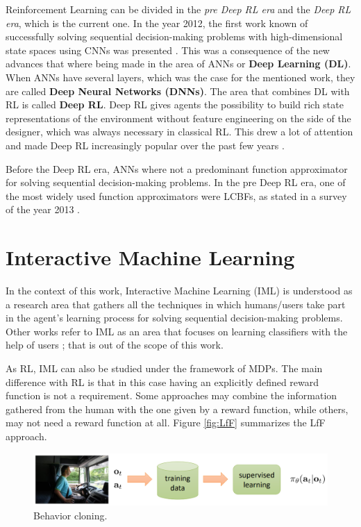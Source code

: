 Reinforcement Learning can be divided in the \emph{pre Deep RL era} and the \emph{Deep RL era}, which is the current one. In the year 2012, the first work known of successfully solving sequential decision-making problems with high-dimensional state spaces using CNNs was presented \cite{Mnih2015}. This was a consequence of the new advances that where being made in the area of ANNs or \textbf{Deep Learning (DL)}. When ANNs have several layers, which was the case for the mentioned work, they are called \textbf{Deep Neural Networks (DNNs)}. The area that combines DL with RL is called \textbf{Deep RL}. Deep RL gives agents the possibility to build rich state representations of the environment without feature engineering on the side of the designer, which was always necessary in classical RL. This drew a lot of attention and made Deep RL increasingly popular over the past few years \cite{franccois2018introduction}.

Before the Deep RL era, ANNs where not a predominant function approximator for solving sequential decision-making problems. In the pre Deep RL era, one of the most widely used function approximators were LCBFs, as stated in a survey of the year 2013 \cite{kober2013reinforcement}. 

\section{Interactive Machine Learning}

In the context of this work, Interactive Machine Learning (IML) is understood as a research area that gathers all the techniques in which humans/users take part in the agent's learning process for solving sequential decision-making problems. Other works refer to IML as an area that focuses on learning classifiers with the help of users \cite{fails2003interactive, ware2001interactive, amershi2012regroup, ngo2014efficient}; that is out of the scope of this work.  

As RL, IML can also be studied under the framework of MDPs. The main difference with RL is that in this case having an explicitly defined reward function is not a requirement. Some approaches may combine the information gathered from the human with the one given by a reward function, while others, may not need a reward function at all. Figure \ref{fig:LfF} summarizes the LfF approach.

\begin{figure}[h]
    \centering
    \includegraphics[width=0.9\linewidth]{imagenes/cap1/b_cloning.png}
    \caption{Behavior cloning.}
    \label{fig:b_cloning}
\end{figure}

